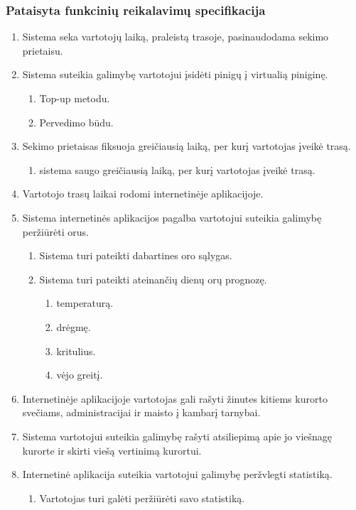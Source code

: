 \documentclass[oneside]{VUMIFPSkursinis}
\begin{document}
\subsubsection{Pataisyta funkcinių reikalavimų specifikacija}
\begin{enumerate}
	\item Sistema seka vartotojų laiką, praleistą trasoje, pasinaudodama sekimo prietaisu.
	\item Sistema suteikia galimybę vartotojui įsidėti pinigų į virtualią piniginę.
	\begin{enumerate}
		\item Top-up metodu.
		\item Pervedimo būdu.
	\end{enumerate}
	\item Sekimo prietaisas fiksuoja greičiausią laiką, per kurį vartotojas įveikė trasą.
	\begin{enumerate}
		\item sistema saugo greičiausią laiką, per kurį vartotojas įveikė trasą.
	\end{enumerate}
	\item Vartotojo trasų laikai rodomi internetinėje aplikacijoje.
	\item Sistema internetinės aplikacijos pagalba vartotojui suteikia galimybę peržiūrėti orus.
	\begin{enumerate}
		\item Sistema turi pateikti dabartines oro sąlygas.
		\item Sistema turi pateikti ateinančių dienų orų prognozę.
		\begin{enumerate}
			\item temperaturą.
			\item drėgmę.
			\item kritulius.
			\item vėjo greitį.
		\end{enumerate}
	\end{enumerate}
	\item Internetinėje aplikacijoje vartotojas gali rašyti žinutes kitiems kurorto svečiams, administracijai ir maisto į kambarį tarnybai.
	\item Sistema vartotojui suteikia galimybę rašyti atsiliepimą apie jo viešnagę kurorte ir skirti viešą vertinimą kurortui.
	\item Internetinė aplikacija suteikia vartotojui galimybę peržvlegti statistiką.
	\begin{enumerate}
		\item Vartotojas turi galėti peržiūrėti savo statistiką.

\end{enumerate}
\end{enumerate}
\end{document}
